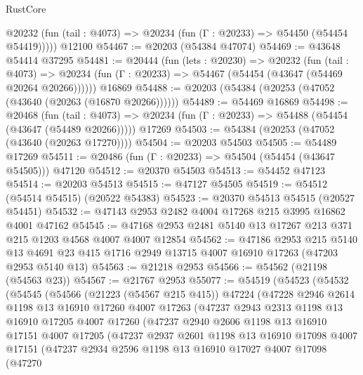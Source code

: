\begin{lexlean}{RustCore}
\begin{coremodule}
      @20232 (fun (tail : @4073) => @20234 (fun (Γ : @20233) => @54450 (@54454 @54419)))))
    @12100
@54467 := @20203 (@54384 @47074)
@54469 := @43648 @54414 @37295
@54481 := @20444
    (fun (lets : @20230) =>
    @20232
      (fun (tail : @4073) =>
      @20234 (fun (Γ : @20233) => @54467 (@54454 (@43647 (@54469 @20264 @20266))))))
    @16869
@54488 := @20203 (@54384 (@20253 (@47052 (@43640 (@20263 (@16870 @20266))))))
@54489 := @54469 @16869
@54498 := @20468
    (fun (tail : @4073) => @20234 (fun (Γ : @20233) => @54488 (@54454 (@43647 (@54489 @20266)))))
    @17269
@54503 := @54384 (@20253 (@47052 (@43640 (@20263 @17270))))
@54504 := @20203 @54503
@54505 := @54489 @17269
@54511 := @20486 (fun (Γ : @20233) => @54504 (@54454 (@43647 @54505))) @47120
@54512 := @20370 @54503
@54513 := @54452 @47123
@54514 := @20203 @54513
@54515 := @47127 @54505
@54519 := @54512 (@54514 @54515) (@20522 @54383)
@54523 := @20370 @54513 @54515 (@20527 @54451)
@54532 := @47143 @2953 @2482 @4004 @17268 @215 @3995 @16862 @4001 @47162
@54545 := @47168 @2953 @2481 @5140 @13 @17267 @213 @371 @215 @1203 @4568 @4007 @4007 @12854
@54562 := @47186
    @2953
    @215
    @5140
    @13
    @4691
    @23
    @415
    @1716
    @2949
    @13715
    @4007
    @16910
    @17263
    (@47203 @2953 @5140 @13)
@54563 := @21218 @2953
@54566 := @54562 (@21198 (@54563 @23))
@54567 := @21767 @2953
@55077 := @54519
    (@54523
      (@54532
        (@54545
          (@54566
            (@21223 (@54567 @215 @415))
            @47224
            (@47228
              @2946
              @2614
              @1198
              @13
              @16910
              @17260
              @4007
              @17263
              (@47237
                @2943
                @2313
                @1198
                @13
                @16910
                @17205
                @4007
                @17260
                (@47237
                  @2940
                  @2606
                  @1198
                  @13
                  @16910
                  @17151
                  @4007
                  @17205
                  (@47237
                    @2937
                    @2601
                    @1198
                    @13
                    @16910
                    @17098
                    @4007
                    @17151
                    (@47237
                      @2934
                      @2596
                      @1198
                      @13
                      @16910
                      @17027
                      @4007
                      @17098
                      (@47270

\end{coremodule}
\end{lexlean}

